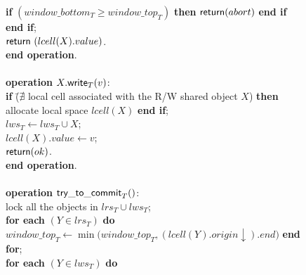 \begin{figure}[htb!]
{{\begin{minipage}[t]{150mm}
\begin{tabbing}
 \>\> {\bf if} $(window\_bottom_T \geq window\_top_T)$ {\bf then}
 		 ${\sf return}(abort)$ {\bf end if}\\


 \>   {\bf end if}; \\

 \>   ${\sf return}~(lcell(X).value)$. \\

{\bf end operation}. \\
\\


{\bf operation}  $X.{\sf write}_T(v)$: \\

 \>  {\bf if} \= 
      ($\nexists$ local cell associated with the R/W shared object $X$) 
         {\bf then} allocate local space $lcell(X)$  {\bf end if}; \\


 \> $lws_T \gets lws_T \cup {X}$;\\


 \> $lcell(X).value \gets v$; \\

 \> ${\sf return}(ok)$.\\

{\bf end operation}. \\
\\





{\bf operation} ${\sf try\_to\_commit}_T()$: \\

 \> lock all the objects in $lrs_T \cup lws_T$; \\

 \> {\bf for each} $(Y \in lrs_T)$ {\bf do} $window\_top_T \leftarrow 
          \min\big(window\_top_T,
     (lcell(Y).origin\downarrow).\mathit{end} \big)$ {\bf end for};\\

 \> {\bf for each} $(Y \in lws_T)$ {\bf do} 
              

\end{tabbing}
\end{minipage}}}
\end{figure}

